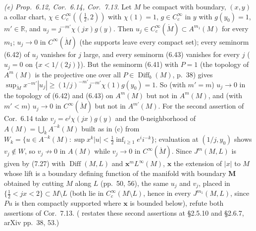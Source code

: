 \documentclass[11pt]{article}
\newcommand{\R}{\mathbb{R}}
\newcommand{\Diff}{\operatorname{Diff}}
\newcommand{\Mo}{\mathring{M}}
\begin{document}
\emph{(e) Prop.~6.12, Cor.~6.14, Cor.~7.13.} Let $M$ be compact with boundary, $(x,y)$ a collar chart, $\chi\in C_c^\infty((\tfrac12,2))$ with $\chi(1)=1$, $g\in C_c^\infty$ in $y$ with $g(y_0)=1$, $m'\in\R$, and $u_j=j^{-m'}\chi(jx)g(y)$. Then $u_j\in C_c^\infty(\Mo)\subset A^{m_1}(M)$ for every $m_1$; $u_j\to0$ in $C^\infty(\Mo)$ (the supports leave every compact set); every seminorm (6.42) of $u_j$ vanishes for $j$ large, and every seminorm (6.43) vanishes for every $j$ ($u_j=0$ on $\{x<1/(2j)\}$). But the seminorm (6.41) with $P=1$ (the topology of $A^m(M)$ is the projective one over all $P\in\Diff_b(M)$, p.~38) gives $\sup_{\Mo}x^{-m'}|u_j|\ge(1/j)^{-m'}j^{-m'}\chi(1)g(y_0)=1$. So (with $m'=m$) $u_j\to0$ in the topology of (6.42) and (6.43) on $A^m(M)$ but not in $A^m(M)$, and (with $m'<m$) $u_j\to0$ in $C^\infty(\Mo)$ but not in $A^{m'}(M)$. For the second assertion of Cor.~6.14 take $v_j=e^j\chi(jx)g(y)$ and the $0$-neighborhood of $A(M)=\bigcup_kA^{-k}(M)$ built as in (c) from $W_k=\{u\in A^{-k}(M):\sup x^k|u|<\tfrac12\inf_{i\ge1}e^ii^{-k}\}$; evaluation at $(1/j,y_0)$ shows $v_j\notin W$, so $v_j\not\to0$ in $A(M)$ while $v_j\to0$ in $C^\infty(\Mo)$. Since $J^m(M,L)$ is given by (7.27) with $\Diff(M,L)$ and $\boldsymbol x^mL^\infty(M)$, $\boldsymbol x$ the extension of $|x|$ to $M$ whose lift is a boundary defining function of the manifold with boundary $\boldsymbol M$ obtained by cutting $M$ along $L$ (pp.~50, 56), the same $u_j$ and $v_j$, placed in $\{\tfrac12<jx<2\}\subset M\setminus L$ (both lie in $C_c^\infty(M\setminus L)$, hence in every $J^{m_1}(M,L)$, since $Pu$ is then compactly supported where $\boldsymbol x$ is bounded below), refute both assertions of Cor.~7.13. (\cite{ALKL24m} restates these second assertions at \S2.5.10 and \S2.6.7, arXiv pp.~38, 53.)
\end{document}
